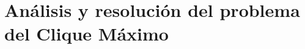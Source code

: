\documentclass[ titlepage,numbers=noenddot,headinclude,oneside, %
                footinclude=true,cleardoublepage=empty,abstractoff, %
                BCOR=5mm,paper=a4,fontsize=11pt,%
                ngerman,spanish,%
                ]{scrreprt}
\begin{document}
\part{Análisis y resolución del problema del Clique Máximo}








\appendix
\cleardoublepage
%
\cleardoublepage
\end{document}
